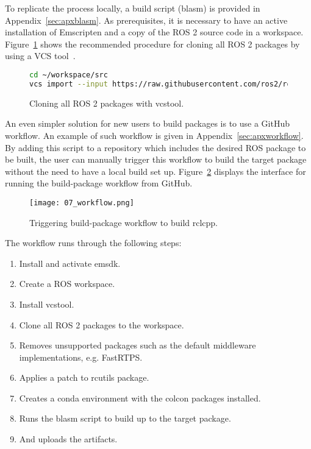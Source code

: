         To replicate the process locally, a build script (\textsf{blasm}) is provided in Appendix~\ref{sec:apxblasm}. As prerequisites, it is necessary to have an active installation of Emscripten and a copy of the \ac{ROS} 2 source code in a workspace. Figure~\ref{fig:vcs} shows the recommended procedure for cloning all \ac{ROS} 2 packages by using a \ac{VCS} tool~\cite{rosinstall}.

        \begin{figure}[htbp]
            \centering
            \begin{lstlisting}[language=Bash]
cd ~/workspace/src
vcs import --input https://raw.githubusercontent.com/ros2/ros2/humble/ros2.repos .
\end{lstlisting}
            \caption{Cloning all \ac{ROS} 2 packages with \textsf{vcstool}.}
            \label{fig:vcs}
        \end{figure}

        An even simpler solution for new users to build packages is to use a GitHub workflow. An example of such workflow is given in Appendix~\ref{sec:apxworkflow}. By adding this script to a repository which includes the desired \ac{ROS} package to be built, the user can manually trigger this workflow to build the target package without the need to have a local build set up. Figure~\ref{fig:workflow} displays the interface for running the \textsf{build-package} workflow from GitHub.

        \begin{figure}[htbp]
            \centering
            \texttt{[image: 07\_workflow.png]}
            \caption{Triggering \textsf{build-package} workflow to build \textsf{rclcpp}.}
            \label{fig:workflow}
        \end{figure}

        \pagebreak

        The workflow runs through the following steps:

        \begin{enumerate}
            \item Install and activate \ac{emsdk}.
            \item Create a \ac{ROS} workspace.
            \item Install \textsf{vcstool}.
            \item Clone all \ac{ROS} 2 packages to the workspace.
            \item Removes unsupported packages such as the default middleware implementations, e.g. \textsf{FastRTPS}.
            \item Applies a patch to \textsf{rcutils} package.
            \item Creates a \textsf{conda} environment with the \textsf{colcon} packages installed.
            \item Runs the \textsf{blasm} script to build up to the target package.
            \item And uploads the artifacts.
        \end{enumerate}

